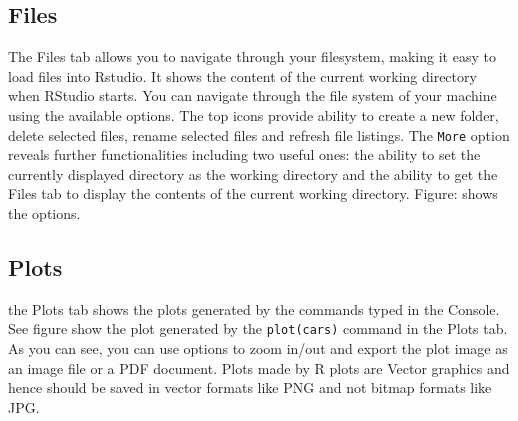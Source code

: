 \documentclass[]{krantz}
\makeatletter
\newenvironment{Shaded}{\begin{snugshade}}{\end{snugshade}}
\newcommand{\CommentTok}[1]{\textcolor[rgb]{0.56,0.35,0.01}{\textit{#1}}}
\newenvironment{kframe}{%
\medskip{}
\setlength{\fboxsep}{.8em}
 \def\at@end@of@kframe{}%
 \ifinner\ifhmode%
  \def\at@end@of@kframe{\end{minipage}}%
  \begin{minipage}{\columnwidth}%
 \fi\fi%
 \def\FrameCommand##1{\hskip\@totalleftmargin \hskip-\fboxsep
 \colorbox{shadecolor}{##1}\hskip-\fboxsep
     \hskip-\linewidth \hskip-\@totalleftmargin \hskip\columnwidth}%
 \MakeFramed {\advance\hsize-\width
   \@totalleftmargin\z@ \linewidth\hsize
   \@setminipage}}%
 {\par\unskip\endMakeFramed%
 \at@end@of@kframe}
\renewenvironment{Shaded}{\begin{kframe}}{\end{kframe}}
\theoremstyle{definition}
\theoremstyle{definition}
\theoremstyle{definition}
\theoremstyle{remark}
\makeatother
\begin{document}
\begin{Shaded}
\begin{Highlighting}[]
\CommentTok{# %
\end{Highlighting}
\end{Shaded}

\subsection{Files}\label{files}

The Files tab allows you to navigate through your filesystem, making it
easy to load files into Rstudio. It shows the content of the current
working directory when RStudio starts. You can navigate through the file
system of your machine using the available options. The top icons
provide ability to create a new folder, delete selected files, rename
selected files and refresh file listings. The \texttt{More} option
reveals further functionalities including two useful ones: the ability
to set the currently displayed directory as the working directory and
the ability to get the Files tab to display the contents of the current
working directory. Figure: shows the options.

\begin{Shaded}
\begin{Highlighting}[]
\CommentTok{# %
\end{Highlighting}
\end{Shaded}

\subsection{Plots}\label{plots}

the Plots tab shows the plots generated by the commands typed in the
Console. See figure show the plot generated by the \texttt{plot(cars)}
command in the Plots tab. As you can see, you can use options to zoom
in/out and export the plot image as an image file or a PDF document.
Plots made by R plots are Vector graphics and hence should be saved in
vector formats like PNG and not bitmap formats like JPG.

\begin{Shaded}
\begin{Highlighting}[]
\CommentTok{# %
\end{Highlighting}
\end{Shaded}
\end{document}
